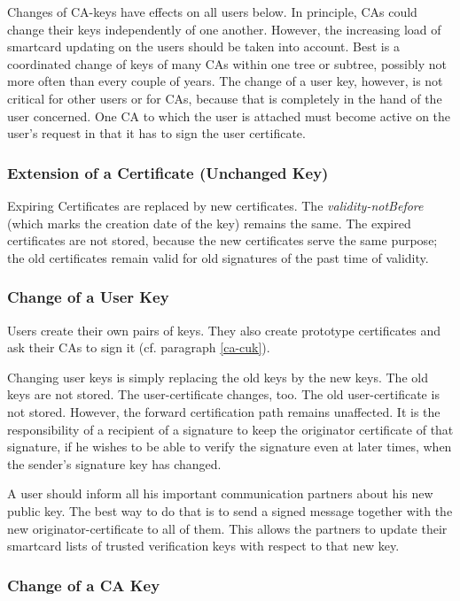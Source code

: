 Changes of CA-keys have effects on all users below.
In principle, CAs could change their keys independently of
one another. However, the increasing load of smartcard updating on
the users should be taken into account.
Best is a coordinated change of keys of many CAs within one tree
or subtree, possibly not more often than every couple of years.
The change of a user key, however, is not critical for other users
or for CAs, because that is completely in the hand
of the user concerned. One CA to which the user is attached
must become active on the user's request in that it has to sign the
user certificate.

\subsubsection{Extension of a Certificate (Unchanged Key)}
\label{ops-ec}

Expiring Certificates are replaced by new certificates.
The {\em validity-notBefore} (which marks the creation date of the key)
remains the same.
The expired certificates are not stored, because the new certificates
serve the same purpose; the old certificates remain valid for
old signatures of the past time of validity.

\subsubsection{Change of a User Key}
\label{ops-cuk}

Users create their own pairs of keys.
They also create prototype certificates and ask their CAs
to sign it (cf. paragraph \ref{ca-cuk}).

Changing user keys is simply replacing the old keys by the new keys.
The old keys are not stored.
The user-certificate changes, too.
The old user-certificate is not stored.
However, the forward certification path remains unaffected.
It is the responsibility of a recipient of a signature to
keep the originator certificate of that signature, if he
wishes to be able to verify the signature even at later times, when the
sender's signature key has changed.

A user should inform all his important communication partners
about his new public key.
The best way to do that is to send a signed message
together with the new originator-certificate to all of them.
This allows the partners to update their smartcard lists of trusted
verification keys with respect to that new key.

\subsubsection{Change of a CA Key}
\label{ops-cck}

